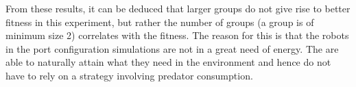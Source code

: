 From these results, it can be deduced that larger groups do not give rise to better fitness in this experiment, but rather the number of groups (a group is of minimum size 2) correlates with the fitness.
The reason for this is that the robots in the port configuration simulations are not in a great need of energy.
The are able to naturally attain what they need in the environment and hence do not have to rely on a strategy involving predator consumption.

























